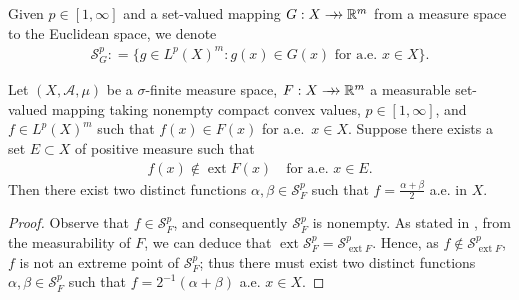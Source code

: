 \documentclass[hidelinks,onefignum,onetabnum]{siamart220329}
\newcommand{\rrightarrow}{\mathrel{\mathrlap{\rightarrow}\mkern1mu\rightarrow}}
\let\twoheadrightarrow\rrightarrow
\newcommand{\ext}{\operatorname{ext}}
\begin{document}
Given $p\in[1,\infty]$ and a set-valued mapping $G:X\twoheadrightarrow\mathbb R^m$ from a measure space to the Euclidean space, we denote 
\begin{align*}
	\mathcal S^p_{G}: = \{g \in L^p(X)^m : g(x) \in G(x)\text{ for a.e.\ } x \in X\}.
\end{align*}

\begin{lemma}\label{extpointlem}
	Let $(X,\mathcal A,\mu)$ be a $\sigma$-finite measure space, $F:X\twoheadrightarrow\mathbb R^m$  a measurable set-valued mapping taking nonempty compact convex values, $p\in[1,\infty]$, and $f\in L^p(X)^m$ such that $f(x)\in F(x)$ for a.e.\ $x\in X$. Suppose there exists a set $E\subset X$ of positive measure such that  
	\begin{align*}
		f(x)\notin \ext F(x)\quad \text{for a.e. $x\in E$.}
	\end{align*}
	Then there exist two distinct functions $\alpha,\beta\in \mathcal S_{F}^p$ such that $f=\displaystyle\frac{\alpha+\beta}{2}$ a.e. in $X$.
\end{lemma}

\begin{proof}
Observe that $f\in \mathcal S^p_F$, and consequently $\mathcal S^p_{F}$ is nonempty. As stated in \cite[Theorem 6.4.26]{Anhand}, from the measurability of $F$, we can deduce that $\ext\mathcal S^p_F=\mathcal S_{\ext F}^p$. Hence, as $f\not\in \mathcal S_{\ext F}^p$, $f$ is not an extreme point of $\mathcal S_F^p$; thus there must exist two distinct functions $\alpha,\beta\in \mathcal S_{F}^p$ such that $f=2^{-1}(\alpha+\beta)$ a.e. $x\in X$.
\end{proof}
\end{document}
